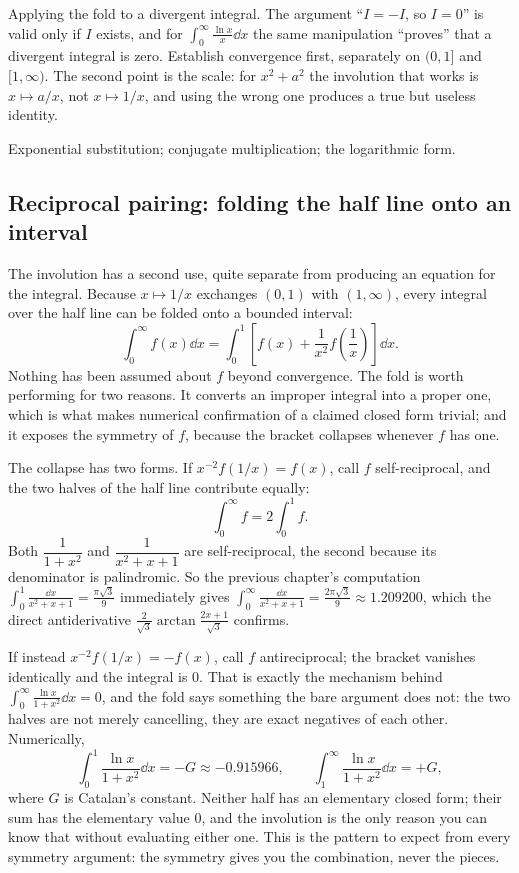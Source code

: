 \begin{trap}
Applying the fold to a divergent integral. The argument ``$I=-I$, so $I=0$'' is valid only if $I$ exists, and for $\int_0^\infty\frac{\ln x}{x}\dd x$ the same manipulation ``proves'' that a divergent integral is zero. Establish convergence first, separately on $(0,1]$ and $[1,\infty)$. The second point is the scale: for $x^2+a^2$ the involution that works is $x\mapsto a/x$, not $x\mapsto1/x$, and using the wrong one produces a true but useless identity.
\end{trap}

\begin{seealsob}Exponential substitution; conjugate multiplication; the logarithmic form.\end{seealsob}

\subsection{Reciprocal pairing: folding the half line onto an interval}

The involution has a second use, quite separate from producing an equation for the integral. Because $x\mapsto1/x$ exchanges $(0,1)$ with $(1,\infty)$, every integral over the half line can be folded onto a bounded interval:
\[
\int_0^{\infty}f(x)\dd x=\int_0^{1}\left[f(x)+\frac{1}{x^{2}}f\!\left(\frac1x\right)\right]\dd x .
\]
Nothing has been assumed about $f$ beyond convergence. The fold is worth performing for two reasons. It converts an improper integral into a proper one, which is what makes numerical confirmation of a claimed closed form trivial; and it exposes the symmetry of $f$, because the bracket collapses whenever $f$ has one.

The collapse has two forms. If $x^{-2}f(1/x)=f(x)$, call $f$ self-reciprocal, and the two halves of the half line contribute equally:
\[
\int_0^{\infty}f=2\int_0^{1}f .
\]
Both $\dfrac{1}{1+x^2}$ and $\dfrac{1}{x^2+x+1}$ are self-reciprocal, the second because its denominator is palindromic. So the previous chapter's computation $\displaystyle\int_0^1\frac{\dd x}{x^2+x+1}=\frac{\pi\sqrt3}{9}$ immediately gives $\displaystyle\int_0^{\infty}\frac{\dd x}{x^2+x+1}=\frac{2\pi\sqrt3}{9}\approx1.209200$, which the direct antiderivative $\tfrac{2}{\sqrt3}\arctan\tfrac{2x+1}{\sqrt3}$ confirms.

If instead $x^{-2}f(1/x)=-f(x)$, call $f$ antireciprocal; the bracket vanishes identically and the integral is $0$. That is exactly the mechanism behind $\displaystyle\int_0^{\infty}\frac{\ln x}{1+x^2}\dd x=0$, and the fold says something the bare argument does not: the two halves are not merely cancelling, they are exact negatives of each other. Numerically,
\[
\int_0^1\frac{\ln x}{1+x^2}\dd x=-G\approx-0.915966,
\qquad
\int_1^{\infty}\frac{\ln x}{1+x^2}\dd x=+G ,
\]
where $G$ is Catalan's constant. Neither half has an elementary closed form; their sum has the elementary value $0$, and the involution is the only reason you can know that without evaluating either one. This is the pattern to expect from every symmetry argument: the symmetry gives you the combination, never the pieces.

